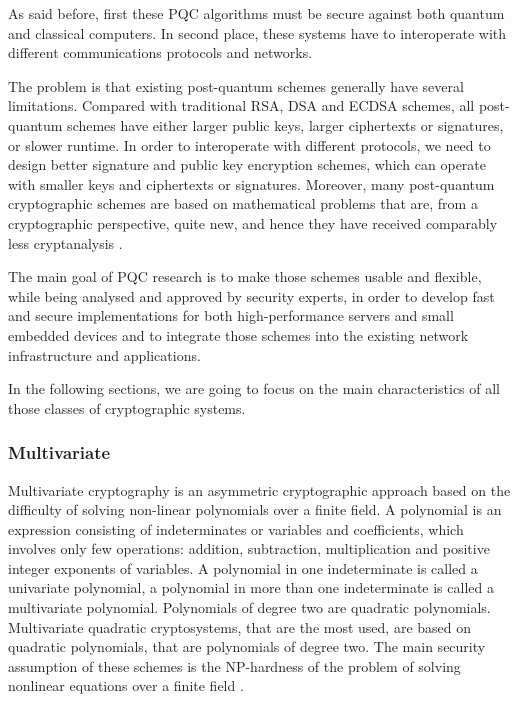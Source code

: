 \documentclass[a4paper,12pt]{article}
\begin{document}
As said before, first these PQC algorithms must be secure against both quantum and classical computers. In second place, these systems have to interoperate with different communications protocols and networks. 

The problem is that existing post-quantum schemes generally have several limitations. Compared with traditional RSA, DSA and ECDSA schemes, all post-quantum schemes have either larger public keys, larger ciphertexts or signatures, or slower runtime. In order to interoperate with different protocols, we need to design better signature and public key encryption schemes, which can operate with smaller keys and ciphertexts or signatures.
Moreover, many post-quantum cryptographic schemes are based on mathematical problems that are, from a cryptographic perspective, quite new, and hence they have received comparably less cryptanalysis \cite{10_postquantum_keyexchange}.

The main goal of PQC research is to make those schemes usable and flexible, while being analysed and approved by security experts, in order to develop fast and secure implementations for both high-performance servers and small embedded devices and to integrate those schemes into the existing network infrastructure and applications.

In the following sections, we are going to focus on the main characteristics of all those classes of cryptographic systems.


\subsubsection{Multivariate}

Multivariate cryptography is an asymmetric cryptographic approach based on the difficulty of solving non-linear polynomials over a finite field. A polynomial is an expression consisting of indeterminates or variables and coefficients, which involves only few operations: addition, subtraction, multiplication and positive integer exponents of variables. A polynomial in one indeterminate is called a univariate polynomial, a polynomial in more than one indeterminate is called a multivariate polynomial. Polynomials of degree two are quadratic polynomials. 
Multivariate quadratic cryptosystems, that are the most used, are based on quadratic polynomials, that are polynomials of degree two. The main security assumption of these schemes is the NP-hardness of the problem of solving nonlinear equations over a finite field \cite{21_multivariate}.
\end{document}
